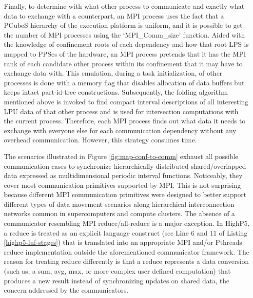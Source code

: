 \documentclass[ASNA,twocolumn]{USG} %
\begin{document}
{Finally, to determine with what other process to communicate and exactly what data to exchange with a counterpart, an MPI process uses the fact that a PCubeS hierarchy of the execution platform is uniform, and it is possible to get the number of MPI processes using the `MPI\_Comm\_size' function. Aided with the knowledge of confinement roots of each dependency and how that root LPS is mapped to PPSes of the hardware, an MPI process pretends that it has the MPI rank of each candidate other process within its confinement that it may have to exchange data with. This emulation, during a task initialization, of other processes is done with a memory flag that disables allocation of data buffers but keeps intact part-id-tree constructions. Subsequently, the folding algorithm mentioned above is invoked to find compact interval descriptions of all interesting LPU data of that other process and is used for intersection computations with the current process. Therefore, each MPI process finds out what data it needs to exchange with everyone else for each communication dependency without any overhead communication. However, this strategy consumes time. 

{\color{red}
The scenarios illustrated in Figure \ref{fig:map-conf-to-comm} exhaust all possible communication cases to synchronize hierarchically distributed shared/overlapped data expressed as multidimensional periodic interval functions. Noticeably, they cover most communication primitives supported by MPI. This is not surprising because different MPI communication primitives were designed to better support different types of data movement scenarios along hierarchical interconnection networks common in supercomputers and compute clusters. The absence of a communicator resembling MPI reduce/all-reduce is a major exception. In HighP5, a reduce is treated as an explicit language construct (see Line 6 and 11 of Listing \ref{highp5-luf-stages}) that is translated into an appropriate MPI and/or Pthreads reduce implementation outside the aforementioned communicator framework. The reason for treating reduce differently is that a reduce represents a data conversion (such as, a sum, avg, max, or more complex user defined computation) that produces a new result instead of synchronizing updates on shared data, the concern addressed by the communicators.  
}

}
\end{document}
